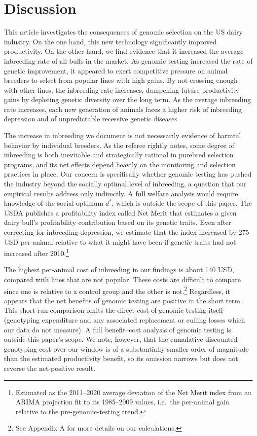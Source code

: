 \documentclass[12pt,letterpaper]{article}
\begin{document}
\section{Discussion\label{sec:discussion}}
This article investigates the consequences of genomic selection on the US dairy industry. On the one hand, this new technology significantly improved productivity. On the other hand, we find evidence that it increased the average inbreeding rate of all bulls in the market. As genomic testing increased the rate of genetic improvement, it appeared to exert competitive pressure on animal breeders to select from popular lines with high gains. By not crossing enough with other lines, the inbreeding rate increases, dampening future productivity gains by depleting genetic diversity over the long term. As the average inbreeding rate increases, each new generation of animals faces a higher risk of inbreeding depression and of unpredictable recessive genetic diseases.

The increase in inbreeding we document is not necessarily evidence of harmful behavior by individual breeders. As the referee rightly notes, some degree of inbreeding is both inevitable and strategically rational in purebred selection programs, and its net effects depend heavily on the monitoring and selection practices in place. Our concern is specifically whether genomic testing has pushed the industry beyond the socially optimal level of inbreeding, a question that our empirical results address only indirectly. A full welfare analysis would require knowledge of the social optimum $d^{*}$, which is outside the scope of this paper. The USDA publishes a profitability index called Net Merit that estimates a given dairy bull's profitability contribution based on its genetic traits. Even after correcting for inbreeding depression, we estimate that the index increased by 275 USD per animal relative to what it might have been if genetic traits had not increased after 2010.\footnote{Estimated as the 2011--2020 average deviation of the Net Merit index from an ARIMA projection fit to its 1985--2009 values, i.e.\ the per-animal gain relative to the pre-genomic-testing trend.}

The highest per-animal cost of inbreeding in our findings is about 140 USD, compared with lines that are not popular. These costs are difficult to compare since one is relative to a control group and the other is not.\footnote{See Appendix A for more details on our calculations.} Regardless, it appears that the net benefits of genomic testing are positive in the short term. This short-run comparison omits the direct cost of genomic testing itself (genotyping expenditure and any associated replacement or culling losses which our data do not measure). A full benefit--cost analysis of genomic testing is outside this paper's scope. We note, however, that the cumulative discounted genotyping cost over our window is of a substantially smaller order of magnitude than the estimated productivity benefit, so its omission narrows but does not reverse the net-positive result. 
\end{document}
